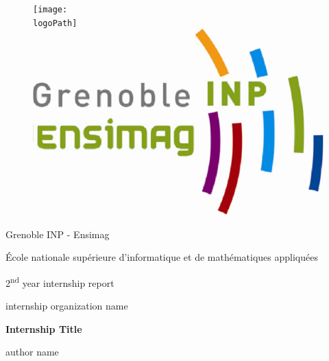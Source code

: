 \documentclass[12pt,a4paper]{report}
\newcommand{\logoPath}{example-image-1x1}                   %
\newcommand{\translationLogo}{2cm}                          %
\newcommand{\organizationName}{internship organization name}%
\newcommand{\internshipTitle}{Internship Title}             %
\newcommand{\authorName}{author name}                       %
\newcommand{\grayIntensity}{25}
\begin{document}
\begin{titlepage}
    \centering
    \begin{figure}[htp]
      \centering
      \hspace{\translationLogo}
      \texttt{[image: \\logoPath]}
      \hfill
      \includegraphics[scale=0.2]{images/logoEnsimag.png}
    \end{figure}
    
	\par\vspace{1cm}
	
	{\LARGE Grenoble INP - Ensimag\par}
	{\normalsize\'Ecole nationale sup\'erieure d'informatique et de math\'ematiques appliqu\'ees\par}
	
	\vspace{1.5cm}
	
	{\LARGE2\textsuperscript{nd} year internship report\par}
	
	\vspace{1.5cm}
	
	{\large\organizationName\par}
	
	\vspace{1.5cm}
	
	{\huge\bfseries\colorbox{gray!\grayIntensity}{\internshipTitle}\par}
	
	\vspace{2cm}
	
	{\large\authorName\par}
	
	\vspace{0.5cm}
	

\end{titlepage}
\end{document}
